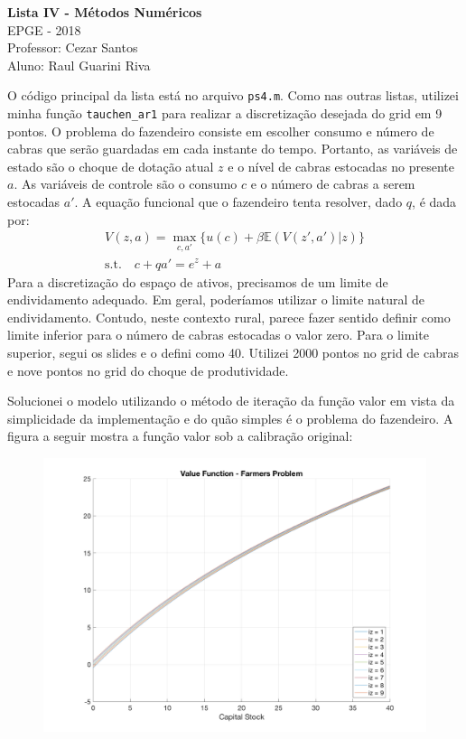 \documentclass[11pt]{article}
\theoremstyle{definition}
\newcommand{\E}{\mathbb{E}}
\theoremstyle{solution}
\begin{document}
	\begin{center}
		{\Large{\textbf{Lista IV - Métodos Numéricos}}}\\
		\vspace{0.2cm}
		EPGE - 2018\\
		Professor: Cezar Santos\\
		Aluno: Raul Guarini Riva
	\end{center}
	

O código principal da lista está no arquivo \texttt{ps4.m}. Como nas outras listas, utilizei minha função \texttt{tauchen\_ar1} para realizar a discretização desejada do grid em 9 pontos. O problema do fazendeiro consiste em escolher consumo e número de cabras que serão guardadas em cada instante do tempo. Portanto, as variáveis de estado são o choque de dotação atual $z$ e o nível de cabras estocadas no presente $a$. As variáveis de controle são o consumo $c$ e o número de cabras a serem estocadas $a'$. A equação funcional que o fazendeiro tenta resolver, dado $q$, é dada por:
\begin{gather*}
	V(z, a) = \max\limits_{c, a'} \{ u(c) + \beta\E(V(z', a')|z)\}\\
	\text{s.t.} \quad c + qa' = e^z + a
\end{gather*}
Para a discretização do espaço de ativos, precisamos de um limite de endividamento adequado. Em geral, poderíamos utilizar o limite natural de endividamento. Contudo, neste contexto rural, parece fazer sentido definir como limite inferior para o número de cabras estocadas o valor zero. Para o limite superior, segui os slides e o defini como 40. Utilizei 2000 pontos no grid de cabras e nove pontos no grid do choque de produtividade.

Solucionei o modelo utilizando o método de iteração da função valor em vista da simplicidade da implementação e do quão simples é o problema do fazendeiro. A figura a seguir mostra a função valor sob a calibração original:
\begin{figure}[h!]
	\centering
	\includegraphics[scale = 0.22]{value_farmers}
\end{figure}
\end{document}
